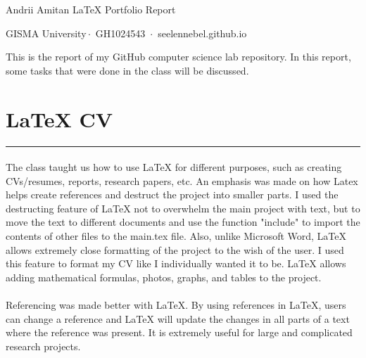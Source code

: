 \documentclass[a4paper,11pt]{article}
\newcommand{\sectitle}[1]{
    \vspace{1.5ex}
    \section{#1}
    \vspace{-3ex}
    \noindent\rule{\textwidth}{0.7pt}
    \vspace{-4ex}
}
\begin{document}
\begin{minipage}{\textwidth}
    \vspace{7ex}
        \par{
        \centering
        \vspace{-0.9in}
            \textcolor{linkcolour}{\Large Andrii Amitan LaTeX Portfolio Report}
        \par}
\end{minipage}

\begin{center}
    GISMA University\,$\cdot$\, {GH1024543} \,$\cdot$\, {seelennebel.github.io}
\end{center}

This is the report of my GitHub computer science lab repository. In this report, some tasks that were done in the class will be discussed.


\sectitle{LaTeX CV}

\paragraph{}
The class taught us how to use LaTeX for different purposes, such as creating CVs/resumes, reports, research papers, etc. An emphasis was made on how Latex helps create references and destruct the project into smaller parts. I used the destructing feature of LaTeX not to overwhelm the main project with text, but to move the text to different documents and use the function "include" to import the contents of other files to the main.tex file. Also, unlike Microsoft Word, LaTeX allows extremely close formatting of the project to the wish of the user. I used this feature to format my CV like I individually wanted it to be. LaTeX allows adding mathematical formulas, photos, graphs, and tables to the project.

\paragraph{}
Referencing was made better with LaTeX. By using references in LaTeX, users can change a reference and LaTeX will update the changes in all parts of a text where the reference was present. It is extremely useful for large and complicated research projects.
\end{document}
